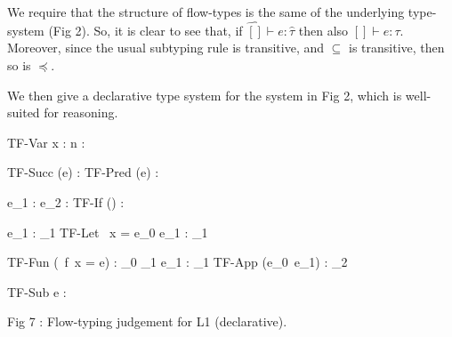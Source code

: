 We require that the structure of flow-types is the same of the underlying
type-system (Fig 2). So, it is clear to see that,
if $\hat{[]}\vdash e : \hat\tau$ then also $[]\vdash e : \tau$.
Moreover, since the usual subtyping rule is transitive, and $\subseteq$
is transitive, then so is $\preceq$.

We then give a declarative type system for the system in Fig 2,
which is well-suited for reasoning.

\begin{center}
                {TF-Var}  {\hat\Gamma \vdash x : \hat\tau}
  \quad {}    {\hat\Gamma \vdash \overline n : }

                {TF-Succ} {\hat\Gamma \vdash {}(e) : }
  \quad {}
                {TF-Pred} {\hat\Gamma \vdash {}(e) : }

                          {\hat\Gamma \vdash e_1 :                  \hat\tau}
                          {\hat\Gamma \vdash e_2 :                  \hat\tau}
                {TF-If}   {\hat\Gamma \vdash () : \hat\tau}

                          {\hat{} \vdash e_1 : \hat\tau_1}
                {TF-Let}  {\hat\Gamma \vdash {}\ x = e_0  e_1 : \hat\tau_1}

                {TF-Fun}  {\hat\Gamma \vdash (\ f\ x = e) : \hat\tau_0
                            \hat\tau_1}
                          {\hat\Gamma \vdash e_1 : \hat\tau_1}
                {TF-App}  {\hat\Gamma \vdash (e_0\ e_1) : \hat\tau_2}

                {TF-Sub}  {\hat\Gamma \vdash e : \hat\tau }

\vspace{.5cm}            Fig 7 : Flow-typing judgement for L1 (declarative).
\end{center}
